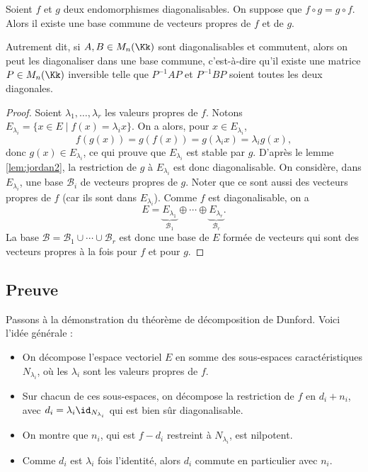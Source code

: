 \documentclass[12pt, class=report,crop=false]{standalone}
\begin{document}
\begin{lemme}
\label{lem:jordan3}
Soient $f$ et $g$ deux endomorphismes diagonalisables. On suppose que 
$f\circ g=g\circ f$. Alors il existe une base commune de vecteurs propres de $f$ et de $g$. 
\end{lemme}

Autrement dit, si $A,B \in M_n(\Kk)$ sont diagonalisables et commutent, alors on peut les diagonaliser dans  une base commune, c'est-à-dire qu'il existe une matrice $P \in M_n(\Kk)$ inversible telle que $P^{-1}AP$ et $P^{-1}BP$ soient toutes les deux diagonales.


\begin{proof}
Soient $\lambda_1,\dots,\lambda_r$ les valeurs propres de $f$. Notons 
$E_{\lambda_i} = \{x\in E \mid f(x)=\lambda_i x\}$. 
On a alors, pour $x\in E_{\lambda_i}$,
$$f(g(x))=g(f(x))=g(\lambda_i x)=\lambda_i g(x),$$
donc $g(x)\in E_{\lambda_i}$, ce qui prouve que $E_{\lambda_i}$ est stable par $g$.
D'après le lemme \ref{lem:jordan2}, la restriction de $g$ à $E_{\lambda_i}$ est donc diagonalisable. On considère, dans $E_{\lambda_i}$, une base $\mathcal{B}_i$ de vecteurs propres de $g$. Noter que ce sont aussi des vecteurs propres de $f$ (car ils sont dans $E_{\lambda_i}$).
Comme $f$ est diagonalisable, on a
$$E=\underbrace{E_{\lambda_1}}_{\mathcal{B}_1}\oplus\cdots\oplus\underbrace{E_{\lambda_r}}_{\mathcal{B}_r}.$$
La base $\mathcal{B}=\mathcal{B}_1\cup\cdots\cup\mathcal{B}_r$ est donc une base de $E$ formée de vecteurs qui sont des vecteurs propres à la fois pour $f$ et pour $g$.
\end{proof}



\subsection{Preuve}

Passons à la démonstration du théorème de décomposition de Dunford. Voici l'idée générale :
\begin{itemize}
  \item On décompose l'espace vectoriel $E$ en somme des sous-espaces caractéristiques
$N_{\lambda_i}$, où les $\lambda_i$ sont les valeurs propres de $f$. 
  \item Sur chacun de ces sous-espaces, on décompose la restriction de $f$ en $d_i+n_i$, avec $d_i = \lambda_i \id_{N_{\lambda_i}}$ qui est bien sûr diagonalisable.
  \item On montre que $n_i$, qui est $f-d_i$ restreint à $N_{\lambda_i}$, est nilpotent.
  \item Comme $d_i$ est $\lambda_i$ fois l'identité, alors $d_i$ commute en particulier 
  avec $n_i$.
\end{itemize}
\end{document}

